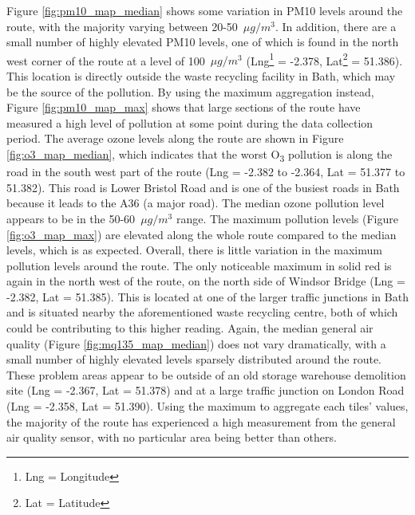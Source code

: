\documentclass[11pt,twosided,a4paper]{report}
\begin{document}
Figure \ref{fig:pm10_map_median} shows some variation in PM10 levels around the route, with the majority varying between 20-50~$\mu g/m^3$. In addition, there are a small number of highly elevated PM10 levels, one of which is found in the north west corner of the route at a level of 100~$\mu g/m^3$ (Lng\footnote{Lng = Longitude} = -2.378, Lat\footnote{Lat = Latitude} = 51.386). This location is directly outside the waste recycling facility in Bath, which may be the source of the pollution. By using the maximum aggregation instead, Figure \ref{fig:pm10_map_max} shows that large sections of the route have measured a high level of pollution at some point during the data collection period. The average ozone levels along the route are shown in Figure \ref{fig:o3_map_median}, which indicates that the worst O\textsubscript{3} pollution is along the road in the south west part of the route (Lng = -2.382 to -2.364, Lat = 51.377 to 51.382). This road is Lower Bristol Road and is one of the busiest roads in Bath because it leads to the A36 (a major road). The median ozone pollution level appears to be in the 50-60~$\mu g/m^3$ range. The maximum pollution levels (Figure \ref{fig:o3_map_max}) are elevated along the whole route compared to the median levels, which is as expected. Overall, there is little variation in the maximum pollution levels around the route. The only noticeable maximum in solid red is again in the north west of the route, on the north side of Windsor Bridge (Lng = -2.382, Lat = 51.385). This is located at one of the larger traffic junctions in Bath and is situated nearby the aforementioned waste recycling centre, both of which could be contributing to this higher reading. Again, the median general air quality (Figure \ref{fig:mq135_map_median}) does not vary dramatically, with a small number of highly elevated levels sparsely distributed around the route. These problem areas appear to be outside of an old storage warehouse demolition site (Lng = -2.367, Lat = 51.378) and at a large traffic junction on London Road (Lng = -2.358, Lat = 51.390). Using the maximum to aggregate each tiles' values, the majority of the route has experienced a high measurement from the general air quality sensor, with no particular area being better than others.
\end{document}
